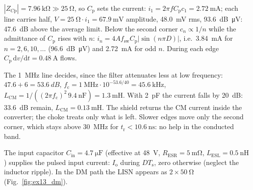 
\begin{solutionblock}
	$|Z_{C\mathrm{p}}|=\SI{7.96}{\kilo\ohm}\gg\SI{25}{\ohm}$, so $C_\mathrm{p}$ sets the current: $i_1=2\pi f C_\mathrm{p}c_1=\SI{2.72}{\milli\ampere}$; each line carries half, $V=\SI{25}{\ohm}\cdot i_1=\SI{67.9}{\milli\volt}$ amplitude, \SI{48.0}{\milli\volt} rms, \SI{93.6}{dB\micro\volt}: \SI{47.6}{dB} above the average limit. Below the second corner $c_n\propto1/n$ while the admittance of $C_\mathrm{p}$ rises with $n$: $i_n=4Af_\mathrm{sw}C_\mathrm{p}|\sin(n\pi D)|$, i.e.\ \SI{3.84}{\milli\ampere} for $n=2,6,10,\ldots$ (\SI{96.6}{dB\micro\volt}) and \SI{2.72}{\milli\ampere} for odd $n$. During each edge $C_\mathrm{p}\,\mathrm{d}v/\mathrm{d}t=\SI{0.48}{\ampere}$ flows.
\end{solutionblock}


\begin{solutionblock}
	The \SI{1}{\mega\hertz} line decides, since the filter attenuates less at low frequency: $47.6+6=\SI{53.6}{dB}$, $f_\mathrm{c}=\SI{1}{\mega\hertz}\cdot10^{-53.6/40}=\SI{45.6}{\kilo\hertz}$, $L_\mathrm{CM}=1/((2\pi f_\mathrm{c})^2\,\SI{9.4}{\nano\farad})=\SI{1.3}{\milli\henry}$. With \SI{2}{\pico\farad} the current falls by \SI{20}{dB}: \SI{33.6}{dB} remain, $L_\mathrm{CM}=\SI{0.13}{\milli\henry}$. The shield returns the CM current inside the converter; the choke treats only what is left. Slower edges move only the second corner, which stays above \SI{30}{\mega\hertz} for $t_\mathrm{r}<\SI{10.6}{\nano\second}$: no help in the conducted band.
\end{solutionblock}



The input capacitor $C_\mathrm{in}=\SI{4.7}{\micro\farad}$ (effective at \SI{48}{\volt}, $R_\mathrm{ESR}=\SI{5}{\milli\ohm}$, $L_\mathrm{ESL}=\SI{0.5}{\nano\henry}$) supplies the pulsed input current: $I_\mathrm{o}$ during $DT_\mathrm{s}$, zero otherwise (neglect the inductor ripple). In the DM path the LISN appears as $2\times\SI{50}{\ohm}$ (Fig.~\ref{fig:ex13_dm}).

